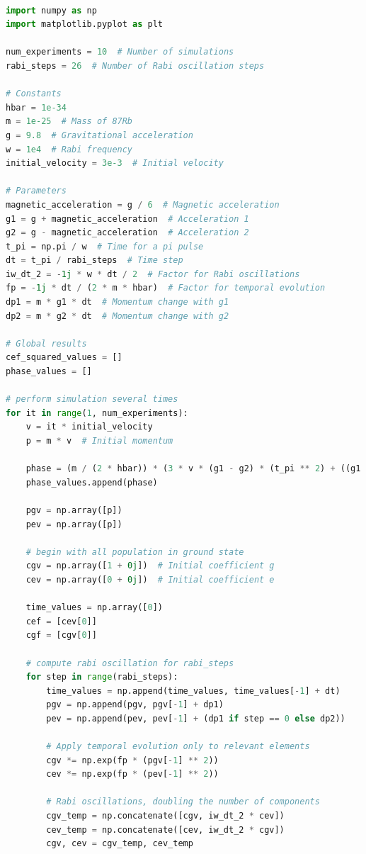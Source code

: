 \documentclass{article}
\begin{document}
\\
\begin{lstlisting}[language=Python, caption=Python code for the simulation of decoherence of the Rabi oscillations in a magnetic gravimeter.]
import numpy as np
import matplotlib.pyplot as plt

num_experiments = 10  # Number of simulations
rabi_steps = 26  # Number of Rabi oscillation steps

# Constants
hbar = 1e-34
m = 1e-25  # Mass of 87Rb
g = 9.8  # Gravitational acceleration
w = 1e4  # Rabi frequency
initial_velocity = 3e-3  # Initial velocity

# Parameters
magnetic_acceleration = g / 6  # Magnetic acceleration
g1 = g + magnetic_acceleration  # Acceleration 1
g2 = g - magnetic_acceleration  # Acceleration 2
t_pi = np.pi / w  # Time for a pi pulse
dt = t_pi / rabi_steps  # Time step
iw_dt_2 = -1j * w * dt / 2  # Factor for Rabi oscillations
fp = -1j * dt / (2 * m * hbar)  # Factor for temporal evolution
dp1 = m * g1 * dt  # Momentum change with g1
dp2 = m * g2 * dt  # Momentum change with g2

# Global results
cef_squared_values = []
phase_values = []

# perform simulation several times
for it in range(1, num_experiments):
    v = it * initial_velocity
    p = m * v  # Initial momentum

    phase = (m / (2 * hbar)) * (3 * v * (g1 - g2) * (t_pi ** 2) + ((g1 ** 2) - (g2 ** 2)) * (t_pi ** 3))
    phase_values.append(phase)

    pgv = np.array([p])
    pev = np.array([p])

    # begin with all population in ground state
    cgv = np.array([1 + 0j])  # Initial coefficient g
    cev = np.array([0 + 0j])  # Initial coefficient e

    time_values = np.array([0])
    cef = [cev[0]]
    cgf = [cgv[0]]

    # compute rabi oscillation for rabi_steps
    for step in range(rabi_steps):
        time_values = np.append(time_values, time_values[-1] + dt)
        pgv = np.append(pgv, pgv[-1] + dp1)
        pev = np.append(pev, pev[-1] + (dp1 if step == 0 else dp2))

        # Apply temporal evolution only to relevant elements
        cgv *= np.exp(fp * (pgv[-1] ** 2))
        cev *= np.exp(fp * (pev[-1] ** 2))

        # Rabi oscillations, doubling the number of components
        cgv_temp = np.concatenate([cgv, iw_dt_2 * cev])
        cev_temp = np.concatenate([cev, iw_dt_2 * cgv])
        cgv, cev = cgv_temp, cev_temp


\end{lstlisting}
\end{document}
